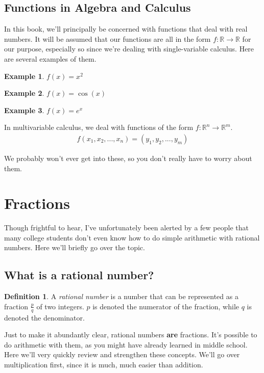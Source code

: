 \documentclass{scrbook}
\theoremstyle{definition}
\newtheorem{definition}{Definition}[section]
\newtheorem{example}{Example}
\newcommand{\R}{\mathbb{R}}
\begin{document}
\subsection{Functions in Algebra and Calculus}

In this book, we'll principally be concerned with functions that deal with real numbers. It will be assumed that our functions are all in the form $f : \R \longrightarrow \R$ for our purpose, especially so since we're dealing with single-variable calculus. Here are several examples of them.

\begin{example}
$f(x) = x^2$
\end{example}

\begin{example}
$f(x) = \cos(x)$
\end{example}

\begin{example}
$f(x) = e^x$
\end{example}

In multivariable calculus, we deal with functions of the form $f : \R^n \longrightarrow \R^m$. 
\begin{align*}
    f(x_1, x_2, ..., x_n) = (y_1, y_2, ..., y_m)
\end{align*}

We probably won't ever get into these, so you don't really have to worry about them. 

\section{Fractions}

Though frightful to hear, I've unfortunately been alerted by a few people that many college students don't even know how to do simple arithmetic with rational numbers. Here we'll briefly go over the topic.

\subsection{What is a rational number?}

\begin{definition}
A \textit{rational number} is a number that can be represented as a fraction $\frac{p}{q}$ of two integers. $p$ is denoted the numerator of the fraction, while $q$ is denoted the denominator. 
\end{definition}

Just to make it abundantly clear, rational numbers \textbf{are} fractions. It's possible to do arithmetic with them, as you might have already learned in middle school. Here we'll very quickly review and strengthen these concepts. We'll go over multiplication first, since it is much, much easier than addition.
\end{document}
